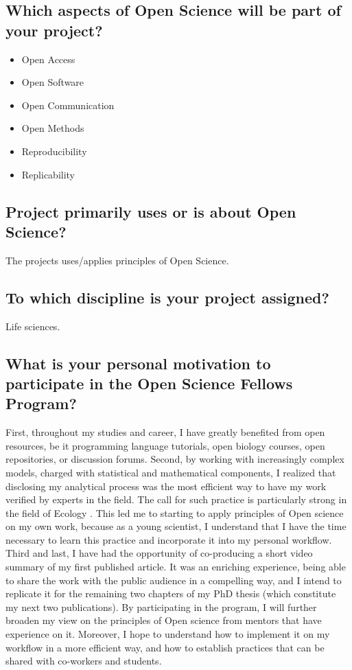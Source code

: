 \documentclass[11pt,]{article}
\begin{document}
\subsection*{Which aspects of Open Science will be part of your project?}
\begin{itemize}
\item Open Access
\item Open Software
\item Open Communication
\item Open Methods
\item Reproducibility
\item Replicability
\end{itemize}

\subsection*{Project primarily uses or is about Open Science?}
The projects uses/applies principles of Open Science.

\subsection*{To which discipline is your project assigned?}
Life sciences.

\subsection*{What is your personal motivation to participate in the Open Science Fellows Program?}
First, throughout my studies and career, I have greatly benefited from open resources, be it programming language tutorials, open biology courses, open repositories, or discussion forums.
Second, by working with increasingly complex models, charged with statistical and mathematical components, I realized that disclosing my analytical process was the most efficient way to have my work  verified by experts in the field.
The call for such practice is particularly strong in the field of Ecology \cite{culina_low_2020, borregaard_towards_2016, mislan_elevating_2016}.
This led me to starting to apply principles of Open science on my own work, because as a young scientist, I understand that I have the time necessary to learn this practice and incorporate it into my personal workflow.
Third and last, I have had the opportunity of co-producing a short video summary of my first published article.
It was an enriching experience, being able to share the work with the public audience in a compelling way, and I intend to replicate it for the remaining two chapters of my PhD thesis (which constitute my next two publications).
By participating in the program, I will further broaden my view on the principles of Open science from mentors that have experience on it.
Moreover, I hope to understand how to implement it on my workflow in a more efficient way, and how to establish practices that can be shared with co-workers and students.
\end{document}
